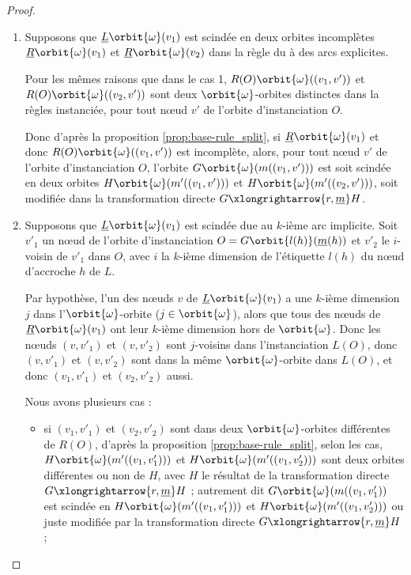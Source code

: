 \begin{proof}
\begin{enumerate}
		\item
		      Supposons que $\underline{L}\orbit{\omega}(v_1)$ est scindée en deux orbites incomplètes
		      $\underline{R}\orbit{\omega}(v_1)$ et $\underline{R}\orbit{\omega}(v_2)$ dans la règle du
		      à des arcs explicites.

		      Pour les mêmes raisons que dans le cas 1, $R(O)\orbit{\omega}((v_1,v'))$ et
		      $R(O)\orbit{\omega}((v_2,v'))$ sont deux $\orbit{\omega}$-orbites distinctes dans la
		      règles instanciée, pour tout nœud $v'$ de l'orbite d'instanciation $O$.

		      Donc d'après la proposition \ref{prop:base-rule_split}, si $\underline{R}\orbit{\omega}(v_1)$
		      et donc $R(O)\orbit{\omega}((v_1, v'))$ est incomplète, alors, pour tout nœud
		      $v'$ de l'orbite d'instanciation $O$, l'orbite
		      $G\orbit{\omega}(m((v_1,v')))$ est soit scindée en deux orbites
		      $H\orbit{\omega}(m'((v_1, v')))$ et $H\orbit{\omega}(m'((v_2, v')))$, soit modifiée dans
		      la transformation directe $G \xlongrightarrow{r,\underline{m}} H$.  %

		\item
		      Supposons que $\underline{L}\orbit{\omega}(v_1)$ est scindée due au $k$-ième arc
		      implicite. Soit $v'_1$ un nœud de l'orbite d'instanciation
		      $O = G\orbit{l(h)}(\underline{m}(h))$ et $v'_2$ le $i$-voisin de $v'_1$ dans
		      $O$, avec $i$ la $k$-ième dimension de l'étiquette $l(h)$ du nœud d'accroche $h$
		      de $L$.

		      Par hypothèse, l'un des nœuds $v$ de $\underline{L}\orbit{\omega}(v_1)$ a une
		      $k$-ième dimension $j$ dans l'$\orbit{\omega}$-orbite ($j \in \orbit{\omega}$), alors que tous
		      des n\oe uds de $\underline{R}\orbit{\omega}(v_1)$ ont leur $k$-ième dimension hors de
		      $\orbit{\omega}$. Donc les nœuds $(v, v'_1)$ et $(v, v'_2)$ sont $j$-voisins dans
		      l'instanciation $L(O)$, donc $(v, v'_1)$ et $(v, v'_2)$ sont dans la même
		      $\orbit{\omega}$-orbite dans $L(O)$, et donc $(v_1, v'_1)$ et $(v_2, v'_2)$ aussi.

		      Nous avons plusieurs cas :
		      \begin{itemize}
			      \item si $(v_1, v'_1)$ et $(v_2, v'_2)$ sont dans deux $\orbit{\omega}$-orbites
			            différentes de $R(O)$, d'après la proposition \ref{prop:base-rule_split}, selon
			            les cas, $H\orbit{\omega}(m'((v_1, v'_1)))$ et $H\orbit{\omega}(m'((v_1,v'_2)))$ sont
			            deux orbites différentes ou non de $H$, avec $H$ le résultat de la
			            transformation directe $G \xlongrightarrow{r, \underline{m}} H$ ; autrement dit
			            $G\orbit{\omega}(m((v_1, v'_1))$ est scindée en $H\orbit{\omega}(m'((v_1, v'_1)))$ et
			            $H\orbit{\omega}(m'((v_1,v'_2)))$ ou juste modifiée par la transformation directe
			            $G \xlongrightarrow{r, \underline{m}} H$ ;


\end{itemize}
\end{enumerate}
\end{proof}
